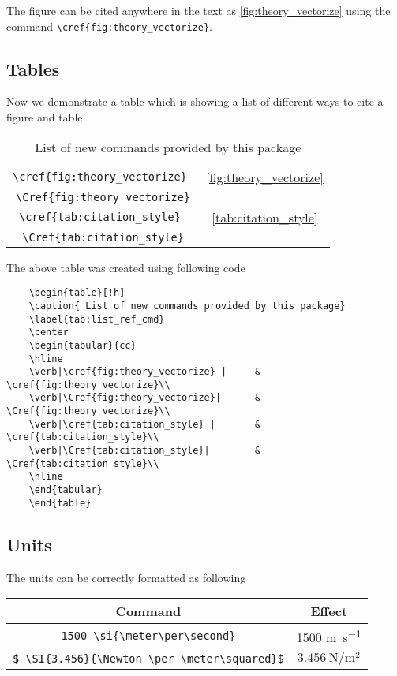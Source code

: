 	The figure can be cited anywhere in the text as \cref{fig:theory_vectorize} using the command \verb|\cref{fig:theory_vectorize}|.



\subsection{Tables}
	Now we demonstrate a table which is showing a list of different ways to cite a figure and table.

\begin{table}[!h]
\caption{ List of new commands provided by this package}
\label{tab:list_ref_cmd}
\center
\begin{tabular}{cc}
	\hline
	\verb|\cref{fig:theory_vectorize} |		&	\cref{fig:theory_vectorize}\\
	\verb|\Cref{fig:theory_vectorize}|		&	\Cref{fig:theory_vectorize}\\
	\verb|\cref{tab:citation_style} |		&	\cref{tab:citation_style}\\
	\verb|\Cref{tab:citation_style}|		&	\Cref{tab:citation_style}\\
	\hline
\end{tabular}
\end{table} 


The above table was created using following code
\begin{verbatim}
	\begin{table}[!h]
	\caption{ List of new commands provided by this package}
	\label{tab:list_ref_cmd}
	\center
	\begin{tabular}{cc}
	\hline
	\verb|\cref{fig:theory_vectorize} |		&	\cref{fig:theory_vectorize}\\
	\verb|\Cref{fig:theory_vectorize}|		&	\Cref{fig:theory_vectorize}\\
	\verb|\cref{tab:citation_style} |		&	\cref{tab:citation_style}\\
	\verb|\Cref{tab:citation_style}|		&	\Cref{tab:citation_style}\\
	\hline
	\end{tabular}
	\end{table} 
\end{verbatim}



\subsection{Units}
The units can be correctly formatted as following\\
\begin{tabular}{cc}
	\hline
	                     Command                      &                   Effect                 \\
	                    \hline
	       \verb|1500 \si{\meter\per\second}|         &        1500 \si{\meter\per\second}        \\
	\verb|$ \SI{3.456}{\Newton \per \meter\squared}$| & $ \SI{3.456}{\newton \per \meter\squared}$\\
	\hline
\end{tabular} 


  